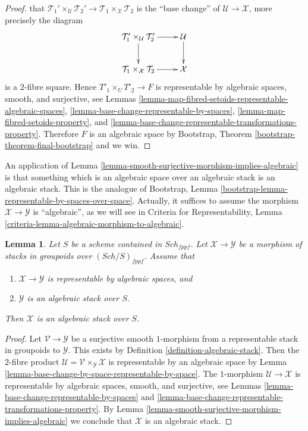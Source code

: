 \documentclass{stacks-project}
\theoremstyle{plain}
\newtheorem{lemma}[subsection]{Lemma}
\theoremstyle{definition}
\theoremstyle{remark}
\numberwithin{equation}{subsection}
\def\Sch{\mathit{Sch}}
\begin{document}
\begin{proof}
that $\mathcal{T}_1' \times_\mathcal{U} \mathcal{T}_2' \to
\mathcal{T}_1 \times_{\mathcal X} \mathcal{T}_2$
is the ``base change'' of $\mathcal{U} \to \mathcal{X}$, more precisely
the diagram
$$
\xymatrix{
\mathcal{T}_1' \times_\mathcal{U} \mathcal{T}_2' \ar[d] \ar[r] &
\mathcal{U} \ar[d] \\
\mathcal{T}_1 \times_{\mathcal X} \mathcal{T}_2 \ar[r] &
\mathcal{X}
}
$$
is a $2$-fibre square.
Hence $T'_1 \times_U T'_2 \to F$ is representable by algebraic spaces,
smooth, and surjective, see
Lemmas \ref{lemma-map-fibred-setoids-representable-algebraic-spaces},
\ref{lemma-base-change-representable-by-spaces},
\ref{lemma-map-fibred-setoids-property}, and
\ref{lemma-base-change-representable-transformations-property}.
Therefore $F$ is an algebraic space by
Bootstrap, Theorem \ref{bootstrap-theorem-final-bootstrap}
and we win.
\end{proof}

\noindent
An application of
Lemma \ref{lemma-smooth-surjective-morphism-implies-algebraic}
is that something which is an algebraic space over an algebraic stack
is an algebraic stack. This is the analogue of
Bootstrap, Lemma \ref{bootstrap-lemma-representable-by-spaces-over-space}.
Actually, it suffices to assume the morphism
$\mathcal{X} \to \mathcal{Y}$ is ``algebraic'', as we will see in
Criteria for Representability,
Lemma \ref{criteria-lemma-algebraic-morphism-to-algebraic}.

\begin{lemma}
\label{lemma-representable-morphism-to-algebraic}
Let $S$ be a scheme contained in $\Sch_{fppf}$.
Let $\mathcal{X} \to \mathcal{Y}$ be a morphism of stacks in groupoids
over $(\Sch/S)_{fppf}$. Assume that
\begin{enumerate}
\item $\mathcal{X} \to \mathcal{Y}$ is representable by algebraic spaces, and
\item $\mathcal{Y}$ is an algebraic stack over $S$.
\end{enumerate}
Then $\mathcal{X}$ is an algebraic stack over $S$.
\end{lemma}

\begin{proof}
Let $\mathcal{V} \to \mathcal{Y}$ be a surjective smooth $1$-morphism
from a representable stack in groupoids to $\mathcal{Y}$. This exists by
Definition \ref{definition-algebraic-stack}.
Then the $2$-fibre product
$\mathcal{U} = \mathcal{V} \times_{\mathcal Y} \mathcal X$
is representable by an algebraic space by
Lemma \ref{lemma-base-change-by-space-representable-by-space}.
The $1$-morphism $\mathcal{U} \to \mathcal X$ is representable by algebraic
spaces, smooth, and surjective, see
Lemmas \ref{lemma-base-change-representable-by-spaces} and
\ref{lemma-base-change-representable-transformations-property}.
By
Lemma \ref{lemma-smooth-surjective-morphism-implies-algebraic}
we conclude that $\mathcal{X}$ is an algebraic stack.
\end{proof}
\end{document}
